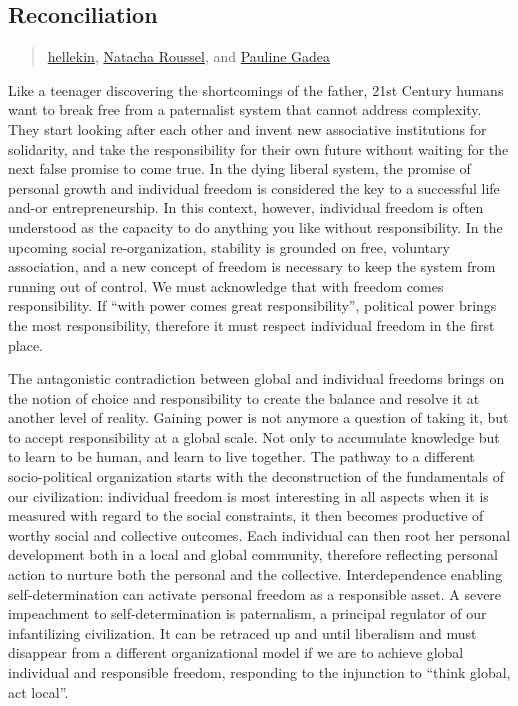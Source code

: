 \subsection{Reconciliation}\label{reconciliation}

\begin{quote}
\hyperlink{hellekin}{hellekin},
\hyperlink{natacha-roussel}{Natacha Roussel},
and \hyperlink{pauline-gadea}{Pauline Gadea}
\end{quote}

Like a teenager discovering the shortcomings of the father, 21st Century
humans want to break free from a paternalist system that cannot address
complexity. They start looking after each other and invent new
associative institutions for solidarity, and take the responsibility for
their own future without waiting for the next false promise to come
true. In the dying liberal system, the promise of personal growth and
individual freedom is considered the key to a successful life and-or
entrepreneurship. In this context, however, individual freedom is often
understood as the capacity to do anything you like without
responsibility. In the upcoming social re-organization, stability is
grounded on free, voluntary association, and a new concept of freedom is
necessary to keep the system from running out of control. We must
acknowledge that with freedom comes responsibility. If ``with power
comes great responsibility'', political power brings the most
responsibility, therefore it must respect individual freedom in the
first place.

The antagonistic contradiction between global and individual freedoms
brings on the notion of choice and responsibility to create the balance
and resolve it at another level of reality. Gaining power is not anymore
a question of taking it, but to accept responsibility at a global scale.
Not only to accumulate knowledge but to learn to be human, and learn to
live together. The pathway to a different socio-political organization
starts with the deconstruction of the fundamentals of our civilization:
individual freedom is most interesting in all aspects when it is
measured with regard to the social constraints, it then becomes
productive of worthy social and collective outcomes. Each individual can
then root her personal development both in a local and global community,
therefore reflecting personal action to nurture both the personal and
the collective. Interdependence enabling self-determination can activate
personal freedom as a responsible asset. A severe impeachment to
self-determination is paternalism, a principal regulator of our
infantilizing civilization. It can be retraced up and until liberalism
and must disappear from a different organizational model if we are to
achieve global individual and responsible freedom, responding to the
injunction to ``think global, act local''.

